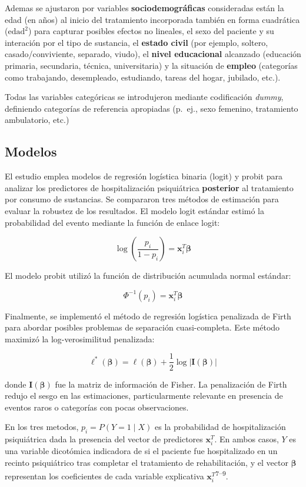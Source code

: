 \documentclass[
  spanish,
  10pt,
]{article}
\begin{document}
Ademas se ajustaron por variables \textbf{sociodemográficas}
consideradas están la edad (en años) al inicio del tratamiento
incorporada también en forma cuadrática (\(\text{edad}^2\)) para
capturar posibles efectos no lineales, el sexo del paciente y su
interación por el tipo de sustancia, el \textbf{estado civil} (por
ejemplo, soltero, casado/conviviente, separado, viudo), el \textbf{nivel
educacional} alcanzado (educación primaria, secundaria, técnica,
universitaria) y la situación de \textbf{empleo} (categorías como
trabajando, desempleado, estudiando, tareas del hogar, jubilado, etc.).

Todas las variables categóricas se introdujeron mediante codificación
\emph{dummy}, definiendo categorías de referencia apropiadas (p.~ej.,
sexo femenino, tratamiento ambulatorio, etc.)

\subsection{Modelos}\label{modelos}

El estudio emplea modelos de regresión logística binaria (logit) y
probit para analizar los predictores de hospitalización psiquiátrica
\textbf{posterior} al tratamiento por consumo de sustancias. Se
compararon tres métodos de estimación para evaluar la robustez de los
resultados. El modelo logit estándar estimó la probabilidad del evento
mediante la función de enlace logit:

\[\log\left(\frac{p_i}{1-p_i}\right) = \mathbf{x}_i^T\boldsymbol{\beta}\]

El modelo probit utilizó la función de distribución acumulada normal
estándar:

\[\Phi^{-1}(p_i) = \mathbf{x}_i^T\boldsymbol{\beta}\]

Finalmente, se implementó el método de regresión logística penalizada de
Firth para abordar posibles problemas de separación cuasi-completa. Este
método maximizó la log-verosimilitud penalizada:

\[\ell^*(\boldsymbol{\beta}) = \ell(\boldsymbol{\beta}) + \frac{1}{2}\log|\mathbf{I}(\boldsymbol{\beta})|\]

donde \(\mathbf{I}(\boldsymbol{\beta})\) fue la matriz de información de
Fisher. La penalización de Firth redujo el sesgo en las estimaciones,
particularmente relevante en presencia de eventos raros o categorías con
pocas observaciones.

En los tres metodos, \(p_i = P(Y=1 \mid X)\) es la probabilidad de
hospitalización psiquiátrica dada la presencia del vector de predictores
\(\mathbf{x}_i^T\). En ambos casos, \(Y\) es una variable dicotómica
indicadora de si el paciente fue hospitalizado en un recinto
psiquiátrico tras completar el tratamiento de rehabilitación, y el
vector \(\boldsymbol{\beta}\) representan los coeficientes de cada
variable explicativa \(\mathbf{x}_i^T\)\textsuperscript{7--9}.
\end{document}
